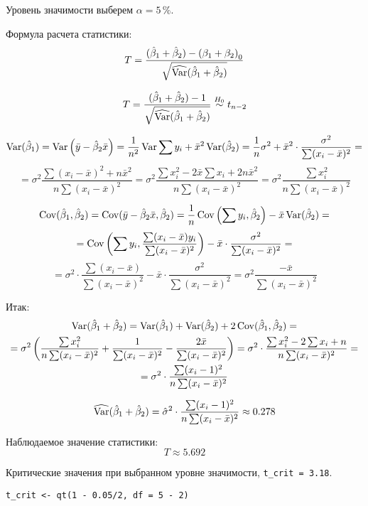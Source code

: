 \begin{problem}
\begin{sol}
\begin{enumerate}
Уровень значимости выберем \(\alpha = 5\,\%\).

Формула расчета статистики:
\[
T = \frac{(\hat{\beta}_1 + \hat{\beta}_2) - \left(\beta_1 + \beta_2\right)_0}{\sqrt{\widehat{\operatorname{Var}} (\hat{\beta}_1 + \hat{\beta}_2)}}
\]

\[
T = \frac{(\hat{\beta}_1 + \hat{\beta}_2) - 1}{\sqrt{\widehat{\operatorname{Var}} (\hat{\beta}_1 + \hat{\beta}_2)}} \overset{H_0}{\sim} t_{n-2}
\]

\[
\operatorname{Var}(\hat{\beta}_1) = \operatorname{Var} \left(\bar{y} - \hat{\beta}_2 \bar{x}\right) = \frac{1}{n^2}\operatorname{Var} \sum y_i + \bar{x}^2 \operatorname{Var} (\hat{\beta}_2) = \frac{1}{n} \sigma^2 + \bar{x}^2 \cdot \frac{\sigma^2}{\sum (x_i - \bar{x})^2} = \]
\[= \sigma^2 \frac{\sum (x_i - \bar{x})^2 + n \bar{x}^2}{n \sum (x_i - \bar{x})^2} = \sigma^2\frac{\sum x_i^2 - 2 \bar{x}\sum x_i + 2n\bar{x}^2}{n \sum (x_i - \bar{x})^2} = \sigma^2\frac{\sum x_i^2}{n \sum (x_i - \bar{x})^2}
\]

\[
\operatorname{Cov}(\hat{\beta}_1, \hat{\beta}_2) = \operatorname{Cov} (\bar{y} - \hat{\beta}_2 \bar{x}, \hat{\beta}_2) = \frac{1}{n} \operatorname{Cov} \left(\sum y_i, \hat{\beta}_2 \right) - \bar{x} \operatorname{Var} (\hat{\beta}_2) = \]
\[= \operatorname{Cov} \left(\sum y_i, \frac{\sum (x_i - \bar{x})y_i}{\sum (x_i - \bar{x})^2} \right)- \bar{x} \cdot \frac{\sigma^2}{\sum (x_i - \bar{x})^2} = \]
\[=\sigma^2 \cdot \frac{\sum (x_i - \bar{x})}{\sum (x_i - \bar{x})^2} - \bar{x} \cdot \frac{\sigma^2}{\sum (x_i - \bar{x})^2} = \sigma^2 \frac{-\bar{x}}{\sum (x_i - \bar{x})^2}
\]

Итак:
\begin{multline}
\operatorname{Var} (\hat{\beta}_1 + \hat{\beta}_2) = \operatorname{Var} (\hat{\beta}_1) + \operatorname{Var} (\hat{\beta}_2) + 2 \operatorname{Cov} (\hat{\beta}_1, \hat{\beta}_2) = \\
=\sigma^2 \left(\frac{\sum x_i^2}{n \sum (x_i - \bar{x})^2} +  \frac{1}{\sum (x_i - \bar{x})^2} - \frac{2\bar{x}}{\sum (x_i - \bar{x})^2}\right) = \sigma^2 \cdot \frac{\sum x_i^2 - 2 \sum x_i + n}{n \sum (x_i - \bar{x})^2} = \\
=\sigma^2 \cdot \frac{\sum (x_i - 1)^2}{n\sum (x_i - \bar{x})^2}
\end{multline}

\[\widehat{\operatorname{Var}} (\hat{\beta}_1 + \hat{\beta}_2) = \hat{\sigma}^2 \cdot \frac{\sum (x_i - 1)^2}{n\sum (x_i - \bar{x})^2} \approx 0.278\]

Наблюдаемое значение статистики:
\[T \approx 5.692 \]

Критические значения при выбранном уровне значимости, \verb|t_crit = 3.18|.
\begin{verbatim}
t_crit <- qt(1 - 0.05/2, df = 5 - 2)
\end{verbatim}


\end{enumerate}
\end{sol}
\end{problem}
